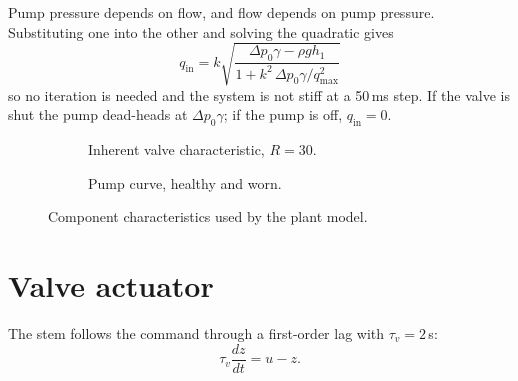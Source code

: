 Pump pressure depends on flow, and flow depends on pump pressure. Substituting
one into the other and solving the quadratic gives
\begin{equation}
  \boxed{\;q_\text{in} = k\sqrt{\dfrac{\Delta p_0\gamma - \rho g h_1}
        {1 + k^2\,\Delta p_0\gamma/q_\text{max}^2}}\;}
  \label{eq:qin}
\end{equation}
so no iteration is needed and the system is not stiff at a 50\,ms step. If the
valve is shut the pump dead-heads at $\Delta p_0\gamma$; if the pump is off,
$q_\text{in}=0$.

\begin{figure}[htbp]
\centering
\begin{subfigure}{0.4\textwidth}
\caption{Inherent valve characteristic, $R=30$.}
\end{subfigure}\hfill
\begin{subfigure}{0.4\textwidth}
\caption{Pump curve, healthy and worn.}
\end{subfigure}
\caption{Component characteristics used by the plant model.}
\label{fig:curves}
\end{figure}

\section{Valve actuator}

The stem follows the command through a first-order lag with
$\tau_v = 2$\,s:
\begin{equation}
  \tau_v \frac{dz}{dt} = u - z .
\end{equation}

